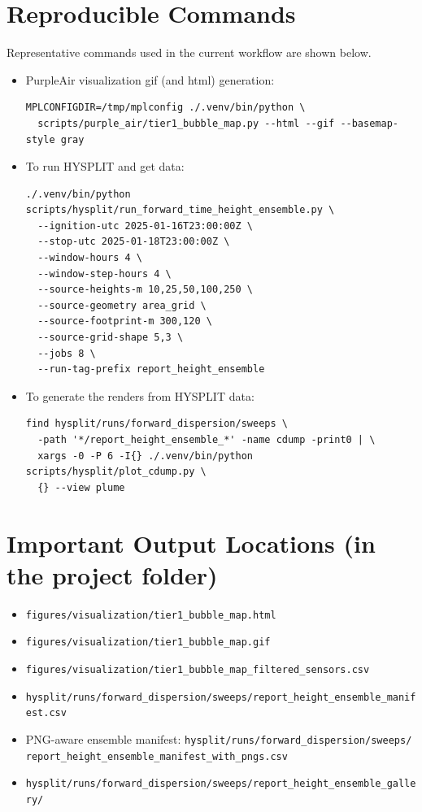 \documentclass[11pt]{article}
\begin{document}
\section*{Reproducible Commands}

Representative commands used in the current workflow are shown below.

\begin{itemize} 
  \item PurpleAir visualization gif (and html) generation:
  \begin{verbatim}
MPLCONFIGDIR=/tmp/mplconfig ./.venv/bin/python \
  scripts/purple_air/tier1_bubble_map.py --html --gif --basemap-style gray
\end{verbatim}

  \item To run HYSPLIT and get data:
  \begin{verbatim}
./.venv/bin/python scripts/hysplit/run_forward_time_height_ensemble.py \
  --ignition-utc 2025-01-16T23:00:00Z \
  --stop-utc 2025-01-18T23:00:00Z \
  --window-hours 4 \
  --window-step-hours 4 \
  --source-heights-m 10,25,50,100,250 \
  --source-geometry area_grid \
  --source-footprint-m 300,120 \
  --source-grid-shape 5,3 \
  --jobs 8 \
  --run-tag-prefix report_height_ensemble
\end{verbatim}

  \item To generate the renders from HYSPLIT data: 
  \begin{verbatim}
find hysplit/runs/forward_dispersion/sweeps \
  -path '*/report_height_ensemble_*' -name cdump -print0 | \
  xargs -0 -P 6 -I{} ./.venv/bin/python scripts/hysplit/plot_cdump.py \
  {} --view plume
\end{verbatim}
\end{itemize}

\section*{Important Output Locations (in the project folder)}

\begin{itemize}
\item \texttt{figures/visualization/tier1\_bubble\_map.html}
\item \texttt{figures/visualization/tier1\_bubble\_map.gif}
\item \texttt{figures/visualization/tier1\_bubble\_map\_filtered\_sensors.csv}
\item \texttt{hysplit/runs/forward\_dispersion/sweeps/report\_height\_ensemble\_manifest.csv}
\item PNG-aware ensemble manifest:
\texttt{hysplit/runs/forward\_dispersion/sweeps/}\\
\texttt{report\_height\_ensemble\_manifest\_with\_pngs.csv}
\item \texttt{hysplit/runs/forward\_dispersion/sweeps/report\_height\_ensemble\_gallery/}
\end{itemize}
\end{document}
